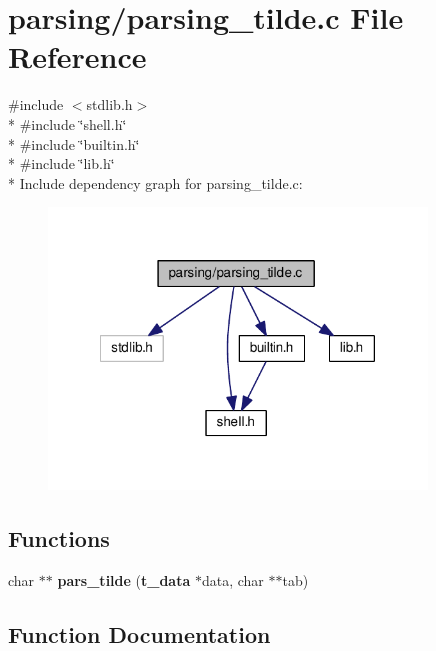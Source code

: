 \section{parsing/parsing\-\_\-tilde.c File Reference}
\label{parsing__tilde_8c}
{\ttfamily \#include $<$stdlib.\-h$>$}\\*
{\ttfamily \#include \char`\"{}shell.\-h\char`\"{}}\\*
{\ttfamily \#include \char`\"{}builtin.\-h\char`\"{}}\\*
{\ttfamily \#include \char`\"{}lib.\-h\char`\"{}}\\*
Include dependency graph for parsing\-\_\-tilde.\-c\-:
\nopagebreak
\begin{figure}[H]
\begin{center}
\leavevmode
\includegraphics[width=285pt]{parsing__tilde_8c__incl}
\end{center}
\end{figure}
\subsection*{Functions}
\begin{DoxyCompactItemize}
\item 
char $\ast$$\ast$ {\bf pars\-\_\-tilde} ({\bf t\-\_\-data} $\ast$data, char $\ast$$\ast$tab)
\end{DoxyCompactItemize}


\subsection{Function Documentation}
